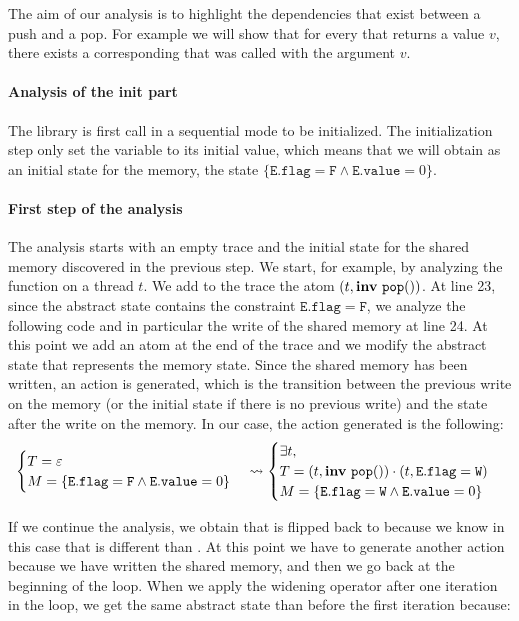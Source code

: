 The aim of our analysis is to highlight the dependencies that exist between a push and a pop. For example we will show that for every  that returns a value $v$, there exists a corresponding  that was called with the argument $v$.



\paragraph{Analysis of the init part} 

The library is first call in a sequential mode to be initialized. The initialization step only set the variable  to its initial value, which means that we will obtain as an initial state for the memory, the state $\{\mathtt{E.flag} = \mathtt{F} \wedge \mathtt{E.value} = 0\}$.


\paragraph{First step of the analysis}

The analysis starts with an empty trace and the initial state for the shared memory discovered in the previous step. We start, for example, by analyzing the  function on a thread $t$. We add to the trace the atom $(t, \mathbf{inv}\ \mathtt{pop}())$. At line 23, since the abstract state contains the constraint $\mathtt{E.flag} = \mathtt{F}$, we analyze the following code and in particular the write of the shared memory at line 24. 
At this point we add an atom at the end of the trace and we modify the abstract state that represents the memory state. Since the shared memory has been written, an action is generated, which is the transition between the previous write on the memory (or the initial state if there is no previous write) and the state after the write on the memory. 
In our case, the action generated is the following:
\[\begin{cases}
	T = \varepsilon\\
	M = \{\mathtt{E.flag} = \mathtt{F} \wedge \mathtt{E.value} = 0\}
\end{cases} \leadsto
\begin{cases}
	\exists t,\\
	T = (t, \mathbf{inv}\ \mathtt{pop}()) \cdot (t, \mathtt{E.flag} = \mathtt{W})\\
	M = \{\mathtt{E.flag} = \mathtt{W} \wedge \mathtt{E.value} = 0\}
\end{cases}\]

If we continue the analysis, we obtain that  is flipped back to  because we know in this case that  is different than . At this point we have to generate another action because we have written the shared memory, and then we go back at the beginning of the loop. 
When we apply the widening operator after one iteration in the loop, we get the same abstract state than before the first iteration because:

